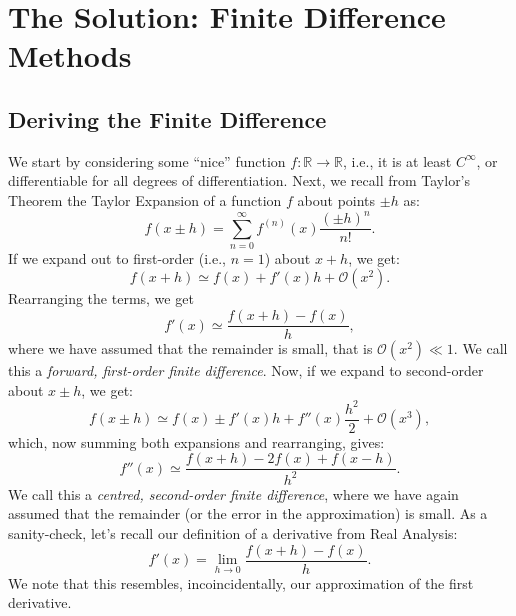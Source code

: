 \documentclass[11pt]{article}
\begin{document}
\section*{The Solution: Finite Difference Methods}

\subsection*{Deriving the Finite Difference}
We start by considering some ``nice'' function $f: \mathbb{R} \to \mathbb{R}$, i.e., it is at least  $C^\infty$, or differentiable for all degrees of differentiation.
Next, we recall from Taylor's Theorem the Taylor Expansion of a function $f$ about points $\pm h$ as:
\begin{equation}
	f\left(x\pm h\right) = \sum_{n=0}^\infty f^{\left(n\right)}\left(x\right)\frac{\left(\pm h\right)^n}{n!}.
	\label{eq:taylor}
\end{equation}
If we expand out to first-order (i.e., $n=1$) about $x+h$, we get:
\begin{equation}
	f\left(x + h\right) \simeq f\left(x\right) + f'\left(x\right)h + \mathcal{O}\left(x^2\right).
\end{equation}
Rearranging the terms, we get
\begin{equation}
	f'\left(x\right) \simeq \frac{f\left(x+h\right) - f\left(x\right)}{h},
	\label{eq:first}
\end{equation}
where we have assumed that the remainder is small, that is $\mathcal{O}\left(x^2\right) \ll 1$.
We call this a \emph{forward, first-order finite difference}.
Now, if we expand to second-order about $x \pm h$, we get:
\begin{equation}
	f\left(x\pm h\right) \simeq f\left(x\right) \pm f'\left(x\right)h + f''\left(x\right) \frac{h^2}{2} + \mathcal{O}\left(x^3\right),
\end{equation}
which, now summing both expansions and rearranging, gives:
\begin{equation}
	f''\left(x\right) \simeq \frac{f\left(x + h \right) - 2f\left(x\right) + f\left(x - h\right)}{h^2}.
	\label{eq:second}
\end{equation}
We call this a \emph {centred, second-order finite difference}, where we have again assumed that the remainder (or the error in the approximation) is small. 
As a sanity-check, let's recall our definition of a derivative from Real Analysis:
\begin{equation}
	f'\left(x\right) = \lim_{h\to 0} \frac{f\left(x+h\right) - f\left(x\right)}{h}.
\end{equation}
We note that this resembles, incoincidentally, our approximation of the first derivative.
\end{document}
